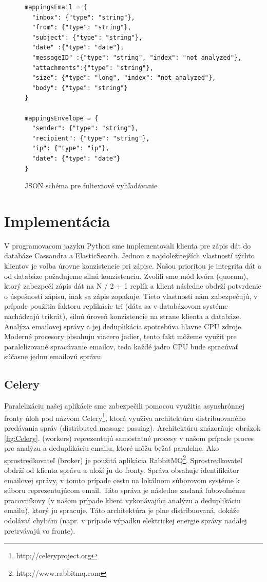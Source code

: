\documentclass[11pt,twoside,a4paper]{book}
\begin{document}
\begin{figure}[h]
\begin{verbatim}
mappingsEmail = {
  "inbox": {"type": "string"},
  "from": {"type": "string"},
  "subject": {"type": "string"},
  "date" :{"type": "date"},
  "messageID" :{"type": "string", "index": "not_analyzed"},
  "attachments":{"type": "string"},
  "size": {"type": "long", "index": "not_analyzed"},
  "body": {"type": "string"}
}   
            
mappingsEnvelope = {
  "sender": {"type": "string"},
  "recipient": {"type": "string"},
  "ip": {"type": "ip"},
  "date": {"type": "date"}
}     
\end{verbatim}
 \caption{JSON schéma pre fultextové vyhľadávanie}
 \label{fig:ESschema}
\end{figure}      


\section{Implementácia}

V programovacom jazyku Python sme implementovali klienta pre zápis dát do databáze Cassandra a ElasticSearch. Jednou z najdoležitejších vlastností týchto klientov je voľba úrovne konzistencie pri zápise. Našou prioritou je integrita dát a od databáze požadujeme silnú konzistenciu. Zvolili sme mód kvóra (quorum), ktorý zabezpečí zápis dát na N / 2 + 1 replík a klient následne obdrží potvrdenie o úspešnosti zápisu, inak sa zápis zopakuje. Tieto vlastnosti nám zabezpečujú, v prípade použitia faktoru replikácie tri (dáta sa v databázovom systéme nachádzajú trikrát), silnú úroveň konzistencie na strane klienta a databáze. Analýza emailovej správy a jej deduplikácia spotrebúva hlavne CPU zdroje. Moderné procesory obsahuju viacero jadier, tento fakt môžeme využiť pre paralelizované spracúvanie emailov, teda každé jadro CPU bude spracúvať súčasne jednu emailovú správu.

\subsection*{Celery}
Paralelizáciu našej aplikácie sme zabezpečili pomocou využitia asynchrónnej fronty úloh pod názvom Celery\footnote{http://celeryproject.org}, ktorá využíva architektúru distribuovaného predávania správ (distributed message passing). Architektúru znázorňuje obrázok \ref{fig:Celery}.  (workers) reprezentujú samostatné procesy v našom prípade proces pre analýzu a deduplikáciu emailu, ktoré môžu bežať paralelne. Ako sprostredkovateľ (broker) je použitá aplikácia RabbitMQ\footnote{http://www.rabbitmq.com}. Sprostredkovateľ obdrží od klienta správu a uloží ju do fronty. Správa obsahuje identifikátor emailovej správy, v tomto prípade cestu na lokálnom súborovom systéme k súboru reprezentujúcom email. Táto správa je následne zaslaná ľubovoľnému pracovníkovy (v našom prípade klient vykonávajúci analýzu a deduplikáciu emailu), ktorý ju spracuje. Táto architektúra je plne distribuovaná, dokáže odolávať chybám (napr. v prípade výpadku elektrickej energie správy nadalej pretrvávajú vo fronte).
\end{document}
